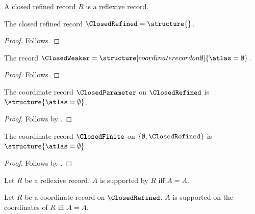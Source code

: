 

\begin{struct}\label{closed_refined_record}
    A closed refined record $R$ is a reflexive record.
\end{struct}

\begin{instance}\label{closed_refined_instance}
    The closed refined record $\ClosedRefined=\structure{}$.
\end{instance}
\begin{proof}
    Follows.
\end{proof}

\begin{instance}\label{closed_weaker_instance}
    The record $\ClosedWeaker=\structure[coordinate record on \emptyset]{\atlas=\emptyset}$.
\end{instance}
\begin{proof}
    Follows.
\end{proof}

\begin{instance}\label{closed_parameter_instance}
    The coordinate record $\ClosedParameter$ on $\ClosedRefined$ is $\structure{\atlas=\emptyset}$.
\end{instance}
\begin{proof}
    Follows by .
\end{proof}

\begin{instance}\label{closed_finite_instance}
    The coordinate record $\ClosedFinite$ on $\{\emptyset,\ClosedRefined\}$ is $\structure{\atlas=\emptyset}$.
\end{instance}
\begin{proof}
    Follows by .
\end{proof}

\begin{definition}\label{closed_instance_guard}
    Let $R$ be a reflexive record.
    $A$ is supported by $R$ iff $A=A$.
\end{definition}

\begin{definition}\label{closed_parameter_guard}
    Let $R$ be a coordinate record on $\ClosedRefined$.
    $A$ is supported on the coordinates of $R$ iff $A=A$.
\end{definition}

